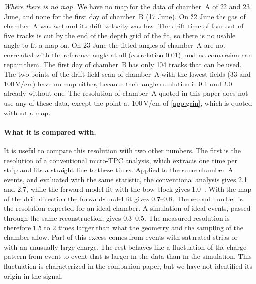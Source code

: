 \emph{Where there is no map.} We have no map for the data of chamber~A of 22 and 23 June, and none for the first
day of chamber~B (17 June). On 22 June the gas of chamber~A was wet and its drift velocity was low. The drift time of
four out of five tracks is cut by the end of the depth grid of the fit, so there is no usable angle to fit a map on.
On 23 June the fitted angles of chamber~A are not correlated with the reference angle at all (correlation 0.01),
and no conversion can repair them. The first day of chamber~B has only 104 tracks that can be used. The two points
of the drift-field scan of chamber~A with the lowest fields (33 and 100\,V/cm) have no map either, because their
angle resolution is 9.1 and 2.0\textdegree{} already without one. The resolution of chamber~A quoted in this paper
does not use any of these data, except the point at 100\,V/cm of \cref{app:gain}, which is quoted without a map.

\paragraph{What it is compared with.} It is useful to compare this resolution with two other numbers. The first is
the resolution of a conventional micro-TPC analysis, which extracts one time per strip and fits a straight line to
these times. Applied to the same chamber~A events, and evaluated with the same statistic, the conventional analysis
gives 2.1\textdegree{} and 2.7\textdegree, while the forward-model fit with the bow block gives 1.0\textdegree~\cite{paperII}.
With the map of the drift direction the forward-model fit gives 0.7--0.8\textdegree. The second number is
the resolution expected for an ideal chamber. A simulation of ideal events, passed through the same reconstruction,
gives 0.3--0.5\textdegree. The measured resolution is therefore 1.5 to 2 times larger than what the geometry
and the sampling of the chamber allow. Part of this excess comes from events with saturated strips or with an
unusually large charge. The rest behaves like a fluctuation of the charge pattern from event to event that is larger
in the data than in the simulation. This fluctuation is characterized in the companion paper, but we have not
identified its origin in the signal.


